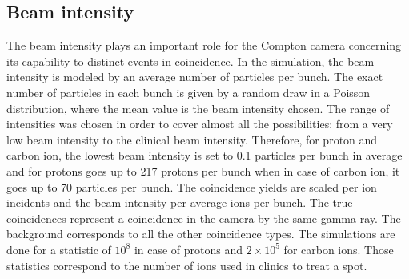 \subsection{Beam intensity }

The beam intensity plays an important role for the Compton camera concerning its capability to distinct events in coincidence. In the simulation, the beam intensity is modeled by an average number of particles per bunch. The exact number of particles in each bunch is given by a random draw in a Poisson distribution, where the mean value is the beam intensity chosen. The range of intensities was chosen in order to cover almost all the possibilities: from a very low beam intensity to the clinical beam intensity. Therefore, for proton and carbon ion, the lowest beam intensity is set to 0.1 particles per bunch in average and for protons goes up to 217 protons per bunch when in case of carbon ion, it goes up to 70 particles per bunch. The coincidence yields are scaled per ion incidents and the beam intensity per average ions per bunch. The true coincidences represent a coincidence in the camera by the same gamma ray. The background corresponds to all the other coincidence types. The simulations are done for a statistic of $10^{8}$ in case of protons and  $2\times10^{5}$ for carbon ions. Those statistics correspond to the number of ions used in clinics to treat a spot.


